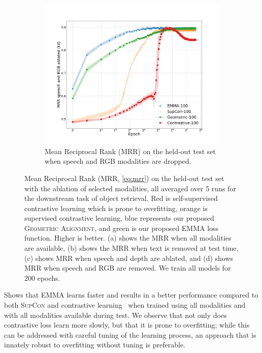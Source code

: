 \documentclass[10pt]{article} %
\newcommand{\ours}{\textsc{EMMA}}
\newcommand{\geom}{\textsc{Geometric Alignment}}
\newcommand{\supcon}{\textsc{SupCon}}
\begin{document}
\begin{figure}
\begin{subfigure}[b]{0.49\textwidth}
        \label{fig:epochs-mrr.lr}
    \end{subfigure}
    \hfill
    \begin{subfigure}[b]{0.49\textwidth}   
        \centering 
        \includegraphics[width=\textwidth]{Figures/average-seeds-epochs-mrr_ld-trimmed.pdf}
        \caption[]{Mean Reciprocal Rank (MRR) on the held-out test set when speech and RGB modalities are dropped.}    
        \label{fig:epochs-mrr.ld}
    \end{subfigure}
    \caption[]
    {Mean Reciprocal Rank (MRR, \cref{eq:mrr}) on the held-out test set with the ablation of selected modalities, all averaged over 5 runs for the downstream task of object retrieval. Red is self-supervised contrastive learning which is prone to overfitting, orange is supervised contrastive learning, blue represents our proposed \geom{}, and green is our proposed \ours{} loss function. Higher is better. (a) shows the MRR when all modalities are available, (b) shows the MRR when text is removed at test time, (c) shows MRR when speech and depth are ablated, and (d) shows MRR when speech and RGB are removed. We train all models for 200 epochs.
    } 
    \label{fig:result_graphs}
\end{figure}
%     
% 
 Shows that \ours{} learns faster and results in a better performance compared to both \supcon{} and contrastive learning~\citep{chen2020simple} when trained using all modalities and with all modalities available during test. We observe that not only does contrastive loss learn more slowly, but that it is prone to overfitting; while this can be addressed with careful tuning of the learning process, an approach that is innately robust to overfitting without tuning is preferable.
\end{document}

